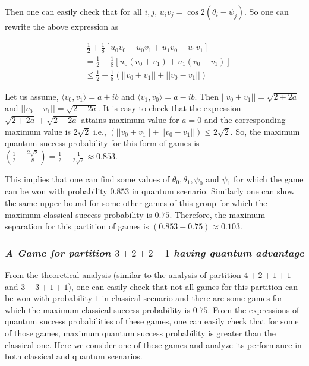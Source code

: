 \documentclass[]{svjour3}
\begin{document}
Then one can easily check that for all $i,j$, $u_{i}v_{j} = \cos{2(\theta_{i} - \psi_{j})}$. So one can rewrite the above expression as

\begin{align*}
&~ \frac{1}{2} + \frac{1}{8} [ u_0v_0 + u_0v_1 + u_1v_0 - u_1v_1]\\
&= \frac{1}{2} + \frac{1}{8} [ u_0 (v_0 + v_1) + u_1 (v_0 - v_1)]\\
&\leq \frac{1}{2} + \frac{1}{8} ( ||v_0 + v_1|| + ||v_0 - v_1||)
\end{align*}

Let us assume, $\langle v_0, v_1 \rangle = a + ib$ and $\langle v_1, v_0 \rangle = a - ib$. Then $||v_0 + v_1|| = \sqrt{2 + 2a}$ and $||v_0 - v_1|| = \sqrt{2 - 2a}$. It is easy to check that the expression $\sqrt{2 + 2a} + \sqrt{2 - 2a}$ attains maximum value for $a = 0$ and the corresponding maximum value is $2\sqrt{2}$ i.e., $ ( ||v_0 + v_1|| + ||v_0 - v_1||) \leq 2\sqrt{2}$. So, the maximum quantum success probability for this form of games is $\left(\frac{1}{2} + \frac{2\sqrt{2}}{8}\right) = \frac{1}{2} + \frac{1}{2\sqrt{2}} \approx 0.853$.

This implies that one can find some values of $\theta_0, \theta_1, \psi_0$ and $\psi_1$ for which the game can be won with probability $0.853$ in quantum scenario. Similarly one can show the same upper bound for some other games of this group for which the maximum classical success probability is $0.75$. Therefore, the maximum separation for this partition of games is $(0.853-0.75) \approx 0.103$.\\


\subsubsection{\it A Game for partition  $3+2+2+1$ having quantum advantage}

From the theoretical analysis (similar to the analysis of partition $4+2+1+1$ and $3+3+1+1$), one can easily check that not all games for this partition can be won with probability $1$ in classical scenario and there are some games for which the maximum classical success probability is $0.75$. From the expressions of quantum success probabilities of these games, one can easily check that for some of those games, maximum quantum success probability is greater than the classical one. Here we consider one of these games and analyze its performance in both classical and quantum scenarios.
\end{document}
